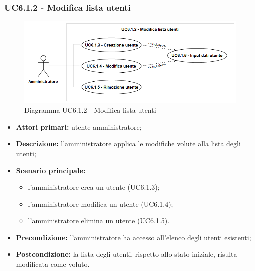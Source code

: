 \subsubsection{UC6.1.2 - Modifica lista utenti}
	\begin{figure}[H]
		\centering
		\includegraphics[width=14cm]{images/UC6.1.2.png}
		\caption{Diagramma UC6.1.2 - Modifica lista utenti}
	\end{figure}
	\begin{itemize}
		\item \textbf{Attori primari:} utente amministratore;
		\item \textbf{Descrizione:} l'amministratore applica le modifiche volute alla lista degli utenti;
		\item \textbf{Scenario principale:} 
		\begin{itemize}
			\item l'amministratore crea un utente (UC6.1.3);
			\item l'amministratore modifica un utente (UC6.1.4);
			\item l'amministratore elimina un utente (UC6.1.5).
		\end{itemize}
		\item \textbf{Precondizione:} l'amministratore ha accesso all'elenco degli utenti esistenti;
		\item \textbf{Postcondizione:} la lista degli utenti, rispetto allo stato iniziale, risulta modificata come voluto.
	\end{itemize}


